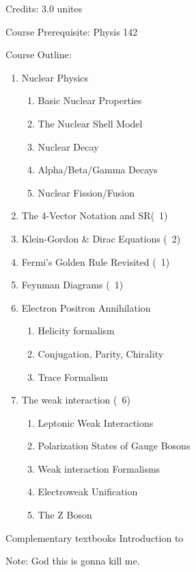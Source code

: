 Credits: 3.0 unites

Course Prerequisite: Physis 142 

Course Outline:
\begin{enumerate}
    \item Nuclear Physics
		\begin{enumerate}
		    \item Basic Nuclear Properties
			\item The Nuclear Shell Model
			\item Nuclear Decay
			\item Alpha/Beta/Gamma Decays
			\item Nuclear Fission/Fusion
		\end{enumerate}
	\item The 4-Vector Notation and SR(~1)
	\item Klein-Gordon & Dirac Equations (~2)
	\item Fermi's Golden Rule Revisited (~1)
	\item Feynman Diagrams (~1)
	\item Electron Positron Annihilation 
		\begin{enumerate}
			\item Helicity formalism 
			\item Conjugation, Parity, Chirality
			\item Trace Formalism
		\end{enumerate}
	\item The weak interaction (~6)
		\begin{enumerate}
		    \item Leptonic Weak Interactions
			\item Polarization States of Gauge Bosons
			\item Weak interaction Formalisms
			\item Electroweak Unification
			\item The Z Boson
		\end{enumerate}
		
		
\end{enumerate}


Complementary textbooks
	Introduction to 

Note: God this is gonna kill me.

